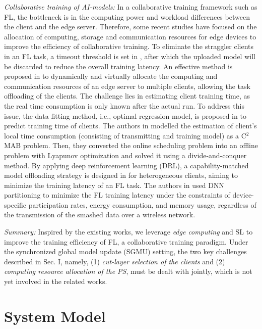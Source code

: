\documentclass[10pt,journal,transmag]{IEEEtran}
\begin{document}
\textit{Collaborative training of AI-models:}
In a collaborative training framework such as FL, the bottleneck is in the computing power and workload differences between the client and the edge server. Therefore, some recent studies have focused on the allocation of computing, storage and communication resources for edge devices to improve the efficiency of collaborative training.
To eliminate the straggler clients in an FL task, a timeout threshold is set in \cite{DBLP:journals/corr/abs-1804-08333}, after which the uploaded model will be discarded to reduce the overall training latency.
An effective method is proposed in \cite{9134409} to dynamically and virtually allocate the computing and communication resources of an edge server to multiple clients, allowing the task offloading of the clients. The challenge lies in estimating client training time, as the real time consumption is only known after the actual run.
To address this issue, the data fitting method, i.e., optimal regression model, is proposed in \cite{9812907} to predict training time of clients. 
The authors in \cite{9272649} modelled the estimation of client's local time consumption (consisting of transmitting and training model) as a C$^2$MAB problem.
Then, they converted the online scheduling problem into an offline problem with Lyapunov optimization and solved it using a divide-and-conquer method.
By applying deep reinforcement learning (DRL), a capability-matched model offloading strategy is designed in \cite{9778210} for heterogeneous clients, aiming to minimize the training latency of an FL task.
The authors in \cite{9999679} used DNN partitioning to minimize the FL training latency under the constraints of device-specific participation rates, energy consumption, and memory usage, regardless of the transmission of the smashed data over a wireless network.

\textit{Summary:} Inspired by the existing works, we leverage \textit{edge computing} and SL to improve the training efficiency of FL, a collaborative training paradigm. Under the synchronized
global model update (SGMU) setting, the two key challenges described in Sec. I, namely, (1) \textit{cut-layer selection of the clients} and (2) \textit{computing resource allocation of the PS}, must be dealt with jointly, which is not yet involved in the related works.


\section{System Model}
\end{document}
